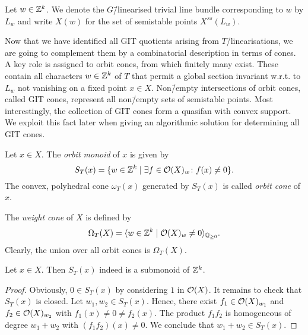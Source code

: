 \begin{notation}
	Let $w\in\mathbb{Z}^k$. We denote the $G$\=/linearised trivial line bundle corresponding to $w$ by $L_w$ and write $X(w)$ for the set of semistable points $X^{ss}(L_w)$.
\end{notation}

Now that we have identified all GIT quotients arising from $T$\=/linearisations, we are going to complement them by a combinatorial description in terms of cones. A key role is assigned to orbit cones, from which finitely many exist. These contain all characters $w\in\mathbb{Z}^k$ of $T$ that permit a global section invariant w.r.t. to $L_w$ not vanishing on a fixed point $x\in X$. Non\=/empty intersections of orbit cones, called GIT cones, represent all non\=/empty sets of semistable points. Most interestingly, the collection of GIT cones form a quasifan with convex support. We exploit this fact later when giving an algorithmic solution for determining all GIT cones.

\begin{defi}
	\label{defi:orbit_cone}
	Let $x\in X$. The \emph{orbit monoid} of $x$ is given by
	$$S_T(x) = \{w\in\mathbb{Z}^k\mid \exists f\in\mathcal{O}(X)_w\colon f(x) \neq 0\}.$$
	The convex, polyhedral cone $\omega_T(x)$ generated by $S_T(x)$ is called \emph{orbit cone} of $x$.
	
	The \emph{weight cone} of $X$ is defined by
	$$\Omega_T(X) = \langle w\in\mathbb{Z}^k\mid \mathcal{O}(X)_w \neq 0 \rangle_{\mathbb{Q}_{\geq 0}}.$$
	Clearly, the union over all orbit cones is $\Omega_T(X)$.
\end{defi}

\begin{lemma}
	Let $x\in X$. Then $S_T(x)$ indeed is a submonoid of $\mathbb{Z}^k$.
\end{lemma}
\begin{proof}
	Obviously, $0\in S_T(x)$ by considering $1$ in $\mathcal{O}(X)$. It remains to check that $S_T(x)$ is closed. Let $w_1, w_2\in S_T(x)$. Hence, there exist $f_1\in\mathcal{O}(X)_{w_1}$ and $f_2\in\mathcal{O}(X)_{w_2}$ with $f_1(x) \neq 0 \neq f_2(x)$.
	The product $f_1f_2$ is homogeneous of degree $w_1+w_2$ with $(f_1f_2)(x) \neq 0$. We conclude that $w_1+w_2\in S_T(x)$.
\end{proof}


